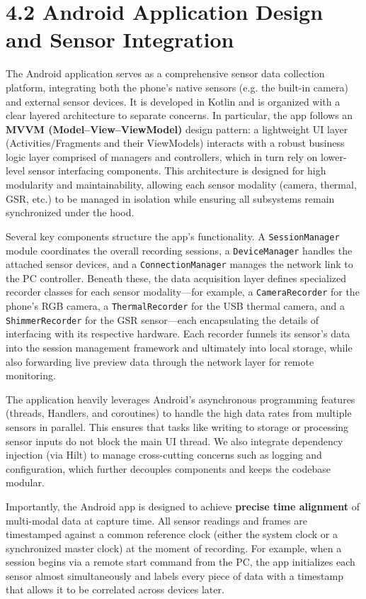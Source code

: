 \section{4.2 Android Application Design and Sensor Integration}

The Android application serves as a comprehensive sensor data collection platform, integrating both the phone's native sensors (e.g. the built-in camera) and external sensor devices. It is developed in Kotlin and is organized with a clear layered architecture to separate concerns. In particular, the app follows an \textbf{MVVM (Model–View–ViewModel)} design pattern: a lightweight UI layer (Activities/Fragments and their ViewModels) interacts with a robust business logic layer comprised of managers and controllers, which in turn rely on lower-level sensor interfacing components. This architecture is designed for high modularity and maintainability, allowing each sensor modality (camera, thermal, GSR, etc.) to be managed in isolation while ensuring all subsystems remain synchronized under the hood.

Several key components structure the app's functionality. A \texttt{SessionManager} module coordinates the overall recording sessions, a \texttt{DeviceManager} handles the attached sensor devices, and a \texttt{ConnectionManager} manages the network link to the PC controller. Beneath these, the data acquisition layer defines specialized recorder classes for each sensor modality—for example, a \texttt{CameraRecorder} for the phone's RGB camera, a \texttt{ThermalRecorder} for the USB thermal camera, and a \texttt{ShimmerRecorder} for the GSR sensor—each encapsulating the details of interfacing with its respective hardware. Each recorder funnels its sensor's data into the session management framework and ultimately into local storage, while also forwarding live preview data through the network layer for remote monitoring.

The application heavily leverages Android's asynchronous programming features (threads, Handlers, and coroutines) to handle the high data rates from multiple sensors in parallel. This ensures that tasks like writing to storage or processing sensor inputs do not block the main UI thread. We also integrate dependency injection (via Hilt) to manage cross-cutting concerns such as logging and configuration, which further decouples components and keeps the codebase modular.

Importantly, the Android app is designed to achieve \textbf{precise time alignment} of multi-modal data at capture time. All sensor readings and frames are timestamped against a common reference clock (either the system clock or a synchronized master clock) at the moment of recording. For example, when a session begins via a remote start command from the PC, the app initializes each sensor almost simultaneously and labels every piece of data with a timestamp that allows it to be correlated across devices later.

